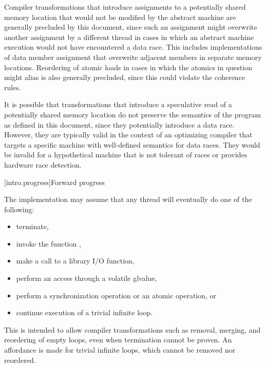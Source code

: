 \pnum
\begin{note}
Compiler transformations that introduce assignments to a potentially
shared memory location that would not be modified by the abstract machine are
generally precluded by this document, since such an assignment might overwrite
another assignment by a different thread in cases in which an abstract machine
execution would not have encountered a data race. This includes implementations
of data member assignment that overwrite adjacent members in separate memory
locations. Reordering of atomic loads in cases in which the atomics in question
might alias is also generally precluded, since this could violate the coherence
rules.
\end{note}

\pnum
\begin{note}
It is possible that transformations that introduce a speculative read of a potentially
shared memory location do not preserve the semantics of the \Cpp{} program as
defined in this document, since they potentially introduce a data race. However,
they are typically valid in the context of an optimizing compiler that targets a
specific machine with well-defined semantics for data races. They would be
invalid for a hypothetical machine that is not tolerant of races or provides
hardware race detection.
\end{note}

[intro.progress]{Forward progress}

\pnum
The implementation may assume that any thread will eventually do one of the
following:
\begin{itemize}
\item terminate,
\item invoke the function ,
\item make a call to a library I/O function,
\item perform an access through a volatile glvalue,
\item perform a synchronization operation or an atomic operation, or
\item continue execution of a trivial infinite loop.
\end{itemize}
\begin{note}
This is intended to allow compiler transformations
such as removal, merging, and reordering of empty loops,
even when termination cannot be proven.
An affordance is made for trivial infinite loops,
which cannot be removed nor reordered.
\end{note}

